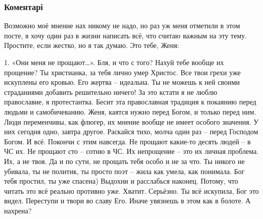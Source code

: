  
 
 
 
 
\subsubsection{Коментарі}

\begin{itemize} %

Возможно моё мнение нах никому не надо, но раз уж меня отметили в этом посте, я
хочу один раз в жизни написать всё, что считаю важным на эту тему. Простите,
если жестко, но я так думаю. Это тебе, Женя:

1. «Они меня не прощают…». Бля, и что с того? Нахуй тебе вообще их прощение? Ты
христианка, за тебя лично умер Христос. Все твои грехи уже искуплены его
кровью. Его жертва – идеальна. Ты не можешь к ней своими страданиями добавить
решительно ничего! За это кстати я не люблю православие, я протестантка. Бесит
эта православная традиция к покаянию перед людьми и самобичеванию. Женя, каятся
нужно перед Богом, и только перед ним. Люди переменчивы, как флюгер, их мнение
вообще не имеет особого значения. У них сегодня одно, завтра другое. Раскайся
тихо, молча один раз – перед Господом Богом. И всё. Покончи с этим навсегда. Не
прощают какие-то десять людей – в ЧС их. Не прощают сто – сотню в ЧС. Их
непрощение – это их личная проблема. Их, а не твоя. Да и по сути, не прощать
тебя особо и не за что. Ты никого не убивала, ты не политик, ты просто поэт –
жила как умела, как понимала. Бог тебя простил, ты уже спасена) Выдохни и
расслабься наконец. Потому, что читать это всё реально противно уже. Хватит.
Серьёзно. Ты всё искупила, Бог это видел. Переступи и твори во славу Его. Иначе
увязнешь в этом как в болоте. А нахрена?


\end{itemize}
